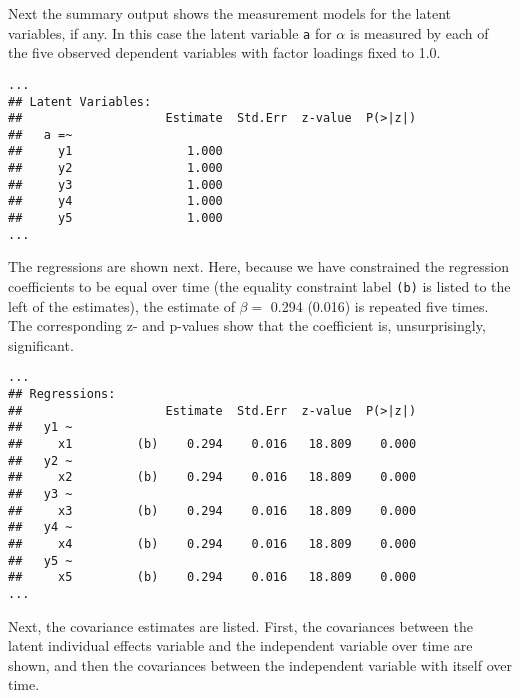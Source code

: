 \documentclass[]{interact}
\theoremstyle{plain}%
\theoremstyle{definition}
\theoremstyle{remark}
\begin{document}
\doublespacing

Next the summary output shows the measurement models for the latent
variables, if any. In this case the latent variable \texttt{a} for
\(\alpha\) is measured by each of the five observed dependent variables
with factor loadings fixed to 1.0.

\singlespacing

\begin{verbatim}
...
## Latent Variables:
##                    Estimate  Std.Err  z-value  P(>|z|)
##   a =~                                                
##     y1                1.000                           
##     y2                1.000                           
##     y3                1.000                           
##     y4                1.000                           
##     y5                1.000                           
...
\end{verbatim}

\doublespacing

The regressions are shown next. Here, because we have constrained the
regression coefficients to be equal over time (the equality constraint
label \texttt{(b)} is listed to the left of the estimates), the estimate
of \(\beta =\) 0.294 (0.016) is repeated five times. The corresponding
z- and p-values show that the coefficient is, unsurprisingly,
significant.

\singlespacing

\begin{verbatim}
...
## Regressions:
##                    Estimate  Std.Err  z-value  P(>|z|)
##   y1 ~                                                
##     x1         (b)    0.294    0.016   18.809    0.000
##   y2 ~                                                
##     x2         (b)    0.294    0.016   18.809    0.000
##   y3 ~                                                
##     x3         (b)    0.294    0.016   18.809    0.000
##   y4 ~                                                
##     x4         (b)    0.294    0.016   18.809    0.000
##   y5 ~                                                
##     x5         (b)    0.294    0.016   18.809    0.000
...
\end{verbatim}

\doublespacing

Next, the covariance estimates are listed. First, the covariances
between the latent individual effects variable and the independent
variable over time are shown, and then the covariances between the
independent variable with itself over time.
\end{document}
